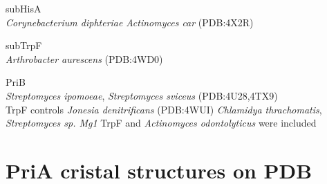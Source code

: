 \documentclass[12pt,twoside]{reedthesis}
\begin{document}
  subHisA\\
  \emph{Corynebacterium diphteriae} \emph{Actinomyces car} (PDB:4X2R)
  
  subTrpF\\
  \emph{Arthrobacter aurescens} (PDB:4WD0)
  
  PriB\\
  \emph{Streptomyces ipomoeae}, \emph{Streptomyces sviceus}
  (PDB:4U28,4TX9)\\
  TrpF controls \emph{Jonesia denitrificans} (PDB:4WUI) \emph{Chlamidya
  thrachomatis}, \emph{Streptomyces sp. Mg1} TrpF and \emph{Actinomyces
  odontolyticus} were included
  
  \clearpage  
  
  \section{PriA cristal structures on
  PDB}\label{pria-cristal-structures-on-pdb}
  
  \begin{Shaded}
  \begin{Highlighting}[]
  \StringTok{ }\NormalTok{(}\NormalTok{, } \NormalTok{,}\NormalTok{)}
   \CharTok{\textbackslash{}\textbackslash{}}\NormalTok{,} \NormalTok{)}
  \end{Highlighting}
  \end{Shaded}
  
\end{document}
